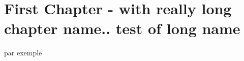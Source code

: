 \chapter{First Chapter - with really long chapter name.. test of long name}
\pagebreak
\begin{paragraph}[color=red,size=\tiny][V][oico]
par exemple
\blindtext
\bfseries{\blindtext}
\end{paragraph}
\begin{paragraph}[background=orange,headingColor=blue,heading=test]
\blindtext
\end{paragraph}
\begin{paragraph}[background=blue]
\blindtext
\end{paragraph}
\blindtext

\blindtext

\blindtext